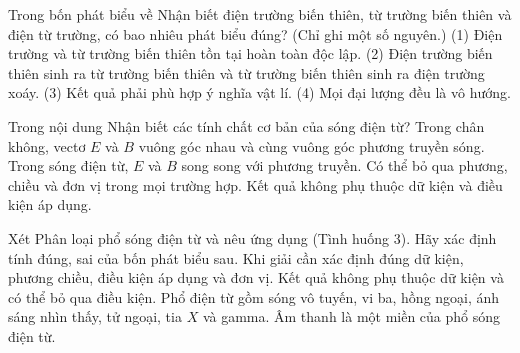 \begin{ex}
Trong bốn phát biểu về Nhận biết điện trường biến thiên, từ trường biến thiên và điện từ trường, có bao nhiêu phát biểu đúng? (Chỉ ghi một số nguyên.) (1) Điện trường và từ trường biến thiên tồn tại hoàn toàn độc lập. (2) Điện trường biến thiên sinh ra từ trường biến thiên và từ trường biến thiên sinh ra điện trường xoáy. (3) Kết quả phải phù hợp ý nghĩa vật lí. (4) Mọi đại lượng đều là vô hướng.
\end{ex}

\begin{ex}
Trong nội dung Nhận biết các tính chất cơ bản của sóng điện từ?
\choice
{\True Trong chân không, vectơ $E$ và $B$ vuông góc nhau và cùng vuông góc phương truyền sóng.}
{Trong sóng điện từ, $E$ và $B$ song song với phương truyền.}
{Có thể bỏ qua phương, chiều và đơn vị trong mọi trường hợp.}
{Kết quả không phụ thuộc dữ kiện và điều kiện áp dụng.}
\end{ex}

\begin{ex}
Xét Phân loại phổ sóng điện từ và nêu ứng dụng (Tình huống 3). Hãy xác định tính đúng, sai của bốn phát biểu sau.
\choiceTF
{\True Khi giải cần xác định đúng dữ kiện, phương chiều, điều kiện áp dụng và đơn vị.}
{Kết quả không phụ thuộc dữ kiện và có thể bỏ qua điều kiện.}
{\True Phổ điện từ gồm sóng vô tuyến, vi ba, hồng ngoại, ánh sáng nhìn thấy, tử ngoại, tia $X$ và gamma.}
{Âm thanh là một miền của phổ sóng điện từ.}
\end{ex}

